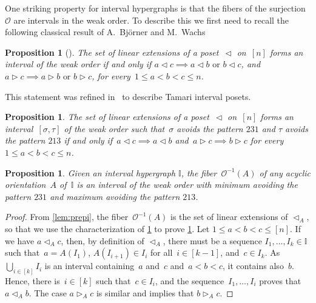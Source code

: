 \documentclass[reqno]{amsart}
\newtheorem{proposition}[theorem]{Proposition}
\theoremstyle{definition}
\newcommand{\less}{\vartriangleleft} %
\newcommand{\more}{\vartriangleright} %
\newcommand{\Or}{\mathcal O}  %
\newcommand{\II}{\mathbb I} %
\begin{document}
One striking property for interval hypergraphs is that the fibers of the surjection~$\Or$ are intervals in the weak order.
To describe this we first need to recall the following classical result of A.~Bj\"orner and M.~Wachs~\cite[Thm.~6.8]{BjornerWachs}

\begin{proposition}[{\cite[Thm.~6.8]{BjornerWachs}}]
\label{prop:WOIP}
The set of linear extensions of a poset~$\less$ on~$[n]$ forms an interval of the weak order if and only if $a \less c \implies a \less b \text{ or } b \less c$, and~$a \more c \implies a \more b \text{ or } b \more c$, for every~$1 \le a < b < c \le n$.
\end{proposition}

This statement was refined in~\cite{ChatelPilaudPons} to describe Tamari interval posets.

\begin{proposition}
\label{prop:TOIP}
The set of linear extensions of a poset~$\less$ on~$[n]$ forms an interval~$[\sigma, \tau]$ of the weak order such that~$\sigma$ avoids the pattern $231$ and $\tau$ avoids the pattern $213$ if and only if~${a \less c \implies a \less b}$ and~$a \more c \implies b \more c$ for every~$1 \le a < b < c \le n$.
\end{proposition}

\begin{proposition}
\label{prop:preimage}
Given an interval hypergraph $\II$, the fiber~$\Or^{-1}(A)$ of any acyclic orientation~$A$ of~$\II$ is an interval of the weak order with minimum avoiding the pattern $231$ and maximum avoiding the pattern $213$.
\end{proposition}

\begin{proof}
From \cref{lem:prepi}, the fiber~$\Or^{-1}(A)$ is the set of linear extensions of $\less_A$, so that we use the characterization of \cref{prop:TOIP} to prove \cref{prop:preimage}.
Let $1 \le a < b < c \le [n]$.
If we have $a \less_{A} c$, then, by definition of $\less_A$, there must be a sequence $I_1, \dots, I_k \in \II$ such that~$a = A(I_1)$, $A(I_{i+1}) \in I_i$ for all~$i \in [k-1]$, and~$c \in I_k$.
As $\bigcup_{i \in [k]} I_i$ is an interval containing~$a$ and~$c$ and~$a < b < c$, it contains also~$b$.
Hence, there is~$i \in [k]$ such that~$c \in I_i$, and the sequence~$I_1, \dots, I_i$ proves that~$a \less_{A} b$.
The case $a \more_{A} c$ is similar and  implies that $b \more_A c$.
\end{proof}
\end{document}
